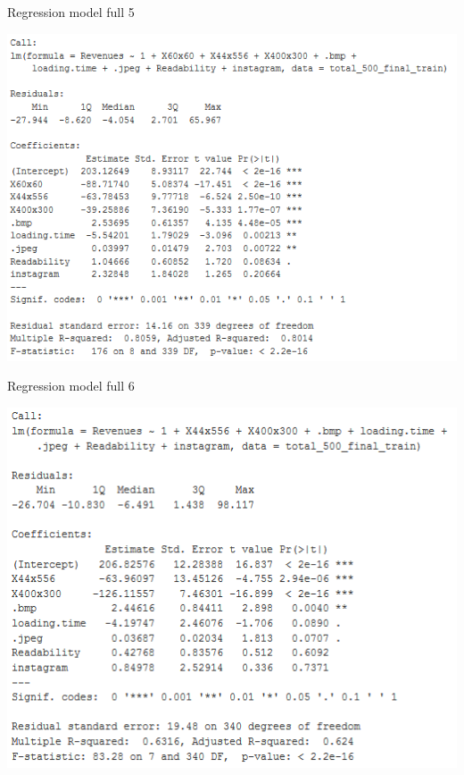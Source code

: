 \documentclass{article}
\begin{document}
\begin{table}[H]
\centering
\caption{Regression model full 5}\label{d :r :5}
\begin{center}
\includegraphics[scale=0.6]{../R/photos/87_full5.PNG}  \\
\end{center}
\end{table}


\begin{table}[H]
\centering
\caption{Regression model full 6}\label{d :r :6}
\begin{center}
\includegraphics[scale=0.6]{../R/photos/99_model6.PNG}  \\
\end{center}
\end{table}
\end{document}

